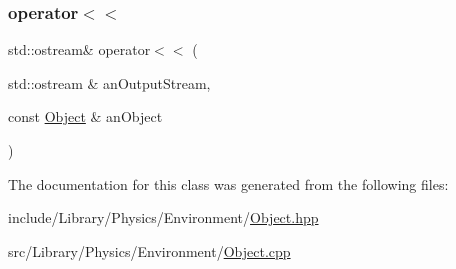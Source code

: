 \subsubsection{\texorpdfstring{operator$<$$<$}{operator<<}}
{\footnotesize\ttfamily std\+::ostream\& operator$<$$<$ (\begin{DoxyParamCaption}\item[{std\+::ostream \&}]{an\+Output\+Stream,  }\item[{const \hyperlink{classlibrary_1_1physics_1_1env_1_1_object}{Object} \&}]{an\+Object }\end{DoxyParamCaption})\hspace{0.3cm}{\ttfamily [friend]}}



The documentation for this class was generated from the following files\+:\begin{DoxyCompactItemize}
\item 
include/\+Library/\+Physics/\+Environment/\hyperlink{_object_8hpp}{Object.\+hpp}\item 
src/\+Library/\+Physics/\+Environment/\hyperlink{_object_8cpp}{Object.\+cpp}\end{DoxyCompactItemize}
